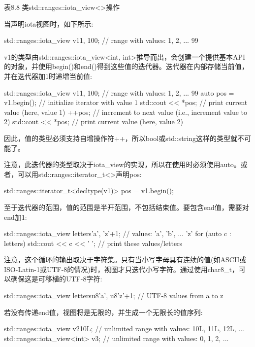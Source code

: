 \begin{center}
表8.8 类std::ranges::iota\_view<>操作
\end{center}

当声明iota视图时，如下所示:

\begin{cpp}
std::ranges::iota_view v1{1, 100}; // range with values: 1, 2, ... 99
\end{cpp}

v1的类型由std::ranges::iota\_view<int, int>推导而出，会创建一个提供基本API的对象，并使用begin()和end()得到这些值的迭代器。迭代器在内部存储当前值，并在迭代器加1时递增当前值:

\begin{cpp}
std::ranges::iota_view v1{1, 100}; // range with values: 1, 2, ... 99
auto pos = v1.begin(); // initialize iterator with value 1
std::cout << *pos; // print current value (here, value 1)
++pos; // increment to next value (i.e., increment value to 2)
std::cout << *pos; // print current value (here, value 2)
\end{cpp}

因此，值的类型必须支持自增操作符++，所以bool或std::string这样的类型就不可能了。

注意，此迭代器的类型取决于iota\_view的实现，所以在使用时必须使用auto。或者，可以用std::ranges::iterator\_t<>声明pos:

\begin{cpp}
std::ranges::iterator_t<decltype(v1)> pos = v1.begin();
\end{cpp}

至于迭代器的范围，值的范围是半开范围，不包括结束值。要包含end值，需要对end加1:

\begin{cpp}
std::ranges::iota_view letters{'a', 'z'+1}; // values: ’a’, ’b’, ... ’z’
for (auto c : letters) {
	std::cout << c << ' '; // print these values/letters
}
\end{cpp}

注意，这个循环的输出取决于字符集。只有当小写字母具有连续的值(如ASCII或ISO-Latin-1或UTF-8的情况)时，视图才只迭代小写字符。通过使用char8\_t，可以确保这是可移植的UTF-8字符:

\begin{cpp}
std::ranges::iota_view letters{u8'a', u8'z'+1}; // UTF-8 values from a to z
\end{cpp}

若没有传递end值，视图将是无限的，并生成一个无限长的值序列:

\begin{cpp}
std::ranges::iota_view v2{10L}; // unlimited range with values: 10L, 11L, 12L, ...
std::ranges::iota_view<int> v3; // unlimited range with values: 0, 1, 2, ...
\end{cpp}


